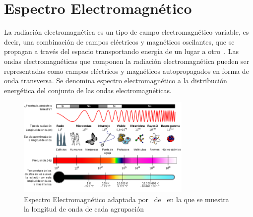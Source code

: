 \section{Espectro Electromagnético}
La radiación electromagnética es un tipo de campo electromagnético variable, es decir, una combinación de campos eléctricos y magnéticos oscilantes, que se propagan a través del espacio transportando energía de un lugar a otro~\cite{Feynman}. Las ondas electromagnéticas que componen la radiación electromagnética pueden ser representadas como campos eléctricos y magnéticos autopropagados en forma de onda transversa. Se denomina espectro electromagnético a la distribución energética del conjunto de las ondas electromagnéticas. 
 \begin{figure}[H]
\centering
\includegraphics[width=0.75\textwidth]{images/espectro.png}
\caption{Espectro Electromagnético adaptada por~\cite{wikies} de~\cite{NASAEspectro} en la que se muestra la longitud de onda de cada agrupación}

\end{figure}
